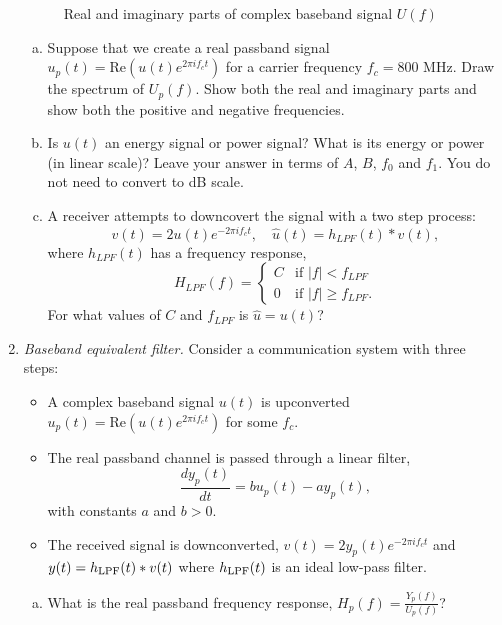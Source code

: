 \documentclass[11pt]{article}
\def\Real{\mathrm{Re}}
\def\Imag{\mathrm{Im}}
\begin{document}
\begin{enumerate}
\begin{figure}[h]

\caption{Real and imaginary parts of complex baseband signal $U(f)$} \label{fig:Ubb}
\end{figure}

\begin{enumerate}[(a)]


\item Suppose that we create a real passband signal $u_p(t) = \Real(u(t)e^{2\pi if_c t})$
for a carrier frequency $f_c = 800$ MHz.  Draw the spectrum of $U_p(f)$.  Show
 both the real and imaginary parts and show both the positive and negative frequencies.

\item Is $u(t)$ an energy signal or power signal?  What is its energy or power (in linear scale)?
Leave your answer in terms of $A$, $B$, $f_0$ and $f_1$.  You do not need to
convert to dB scale.

\item A receiver attempts to downcovert the signal with a two step process:
\[
    v(t)= 2u(t)e^{-2\pi i f_c t}, \quad \hat{u}(t) = h_{LPF}(t) * v(t),
\]
where $h_{LPF}(t)$ has a frequency response,
\[
    H_{LPF}(f) = \begin{cases}
        C & \mbox{if } |f| < f_{LPF} \\
        0 & \mbox{if } |f| \geq f_{LPF}.
        \end{cases}
\]
For what values of $C$ and $f_{LPF}$ is $\hat{u}=u(t)$?
\end{enumerate}

\item \emph{Baseband equivalent filter.}
Consider a communication system with three steps:
\begin{itemize}
\item A complex baseband signal $u(t)$ is upconverted $u_p(t)=\Real(u(t)e^{2\pi if_ct})$
for some $f_c$.
\item The real passband channel is passed through a linear filter,
\[
    \frac{dy_p(t)}{dt} = b u_p(t)- ay_p(t),
\]
with constants $a$ and $b>0$.
\item The received signal is downconverted, $v(t)=2y_p(t)e^{-2\pi i f_ct}$ and
$y(t)=h_{\rm LPF}(t)*v(t)$ where $h_{\rm LPF}(t)$ is an ideal low-pass filter.
\end{itemize}
\begin{enumerate}[(a)]
\item What is the real passband frequency response, $H_p(f) = \frac{Y_p(f)}{U_p(f)}$?


\end{enumerate}
\end{enumerate}
\end{document}

